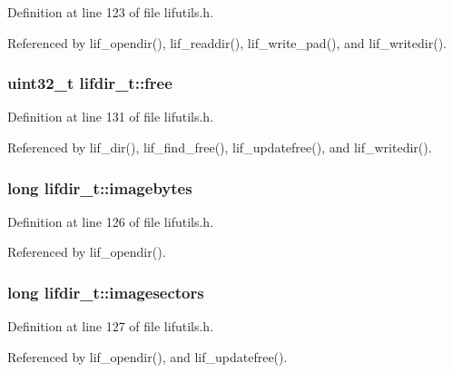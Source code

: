 Definition at line 123 of file lifutils.\+h.



Referenced by lif\+\_\+opendir(), lif\+\_\+readdir(), lif\+\_\+write\+\_\+pad(), and lif\+\_\+writedir().

\subsubsection[{\texorpdfstring{free}{free}}]{\setlength{\rightskip}{0pt plus 5cm}uint32\+\_\+t lifdir\+\_\+t\+::free}\hypertarget{structlifdir__t_a502d704fe63e12080538e415ef3af68e}{}\label{structlifdir__t_a502d704fe63e12080538e415ef3af68e}


Definition at line 131 of file lifutils.\+h.



Referenced by lif\+\_\+dir(), lif\+\_\+find\+\_\+free(), lif\+\_\+updatefree(), and lif\+\_\+writedir().

\subsubsection[{\texorpdfstring{imagebytes}{imagebytes}}]{\setlength{\rightskip}{0pt plus 5cm}long lifdir\+\_\+t\+::imagebytes}\hypertarget{structlifdir__t_a17f59e8c3d17643205266afda1fc07e4}{}\label{structlifdir__t_a17f59e8c3d17643205266afda1fc07e4}


Definition at line 126 of file lifutils.\+h.



Referenced by lif\+\_\+opendir().

\subsubsection[{\texorpdfstring{imagesectors}{imagesectors}}]{\setlength{\rightskip}{0pt plus 5cm}long lifdir\+\_\+t\+::imagesectors}\hypertarget{structlifdir__t_a142bc82acfe24a55318aeb19f7ae9e8e}{}\label{structlifdir__t_a142bc82acfe24a55318aeb19f7ae9e8e}


Definition at line 127 of file lifutils.\+h.



Referenced by lif\+\_\+opendir(), and lif\+\_\+updatefree().


